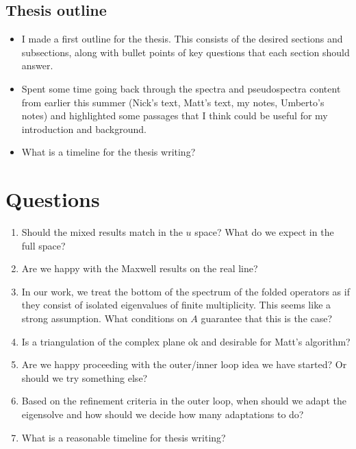 \documentclass[12pt,a4paper]{article}
\begin{document}
\subsection{Thesis outline}

\begin{itemize}
    \item I made a first outline for the thesis. This consists of the desired sections and subsections, along with bullet points of key questions that each section should answer.
    \item Spent some time going back through the spectra and pseudospectra content from earlier this summer (Nick's text, Matt's text, my notes, Umberto's notes) and highlighted some passages that I think could be useful for my introduction and background. 
    \item What is a timeline for the thesis writing? 
\end{itemize}

\section{Questions}
\begin{enumerate}
    \item Should the mixed results match in the $u$ space? What do we expect in the full space?
    \item Are we happy with the Maxwell results on the real line? 
    \item In our work, we treat the bottom of the spectrum of the folded operators as if they consist of isolated eigenvalues of finite multiplicity. This seems like a strong assumption. What conditions on $A$ guarantee that this is the case? 
    \item Is a triangulation of the complex plane ok and desirable for Matt's algorithm?
    \item Are we happy proceeding with the outer/inner loop idea we have started? Or should we try something else?
    \item Based on the refinement criteria in the outer loop, when should we adapt the eigensolve and how should we decide how many adaptations to do? 
    \item What is a reasonable timeline for thesis writing?
\end{enumerate}
\end{document}
